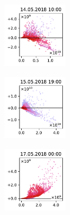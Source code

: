 \begin{figure}[H]
    \centering
    \begin{subfigure}
        \centering
        \includegraphics[width=0.30\textwidth,valign=t]{evaluation/figures/perturbations/perturbation-14.05.2018:10.00-temperature-sub-2K.pdf}
    \end{subfigure}
    \begin{subfigure}
        \centering
        \includegraphics[width=0.30\textwidth,valign=t]{evaluation/figures/perturbations/perturbation-15.05.2018:19.00-temperature-sub-2K.pdf}
    \end{subfigure}
    \begin{subfigure}
        \centering
        \includegraphics[width=0.30\textwidth,valign=t]{evaluation/figures/perturbations/perturbation-17.05.2018:00.00-temperature-sub-2K.pdf}
    \end{subfigure}


\end{figure}
